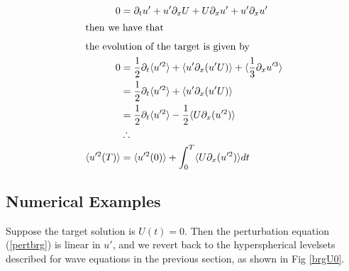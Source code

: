 \documentclass[longbibliography,twocolumn,amsmath,amssymb,aps,nofootinbib]{revtex4-2}
\newcommand{\davg}[1]{\langle {#1} \rangle}
\begin{document}
\begin{align}
  0 &= \partial_t u' + u'\partial_x U + U\partial_x u' + u'\partial_x u' \label{pertbrg}\\
  \intertext{then we have that}
  \intertext{the evolution of the target is given by}
  0 &= \frac{1}{2}\partial_t \davg{u'^2} + \davg{u' \partial_x (u'U)} + \davg{\frac{1}{3}\partial_x u'^3} \nonumber \\
  &= \frac{1}{2}\partial_t \davg{u'^2} +  \davg{u' \partial_x (u'U)} \nonumber \\
  &= \frac{1}{2}\partial_t \davg{u'^2} - \frac{1}{2}\davg{U \partial_x (u'^2)} \nonumber \\
  &\therefore\nonumber\\
  \davg{u'^2(T)} &= \davg{u'^2(0)} + \int_0^T \davg{U \partial_x (u'^2)} dt \label{objburgeq}
\end{align}

\subsection*{Numerical Examples}
Suppose the target solution is $U(t) = 0$. Then the perturbation equation (\ref{pertbrg}) is linear in $u'$, and we revert back to the hyperspherical levelsets described for wave equations in the previous section, as shown in Fig \ref{brgU0}.
\end{document}
